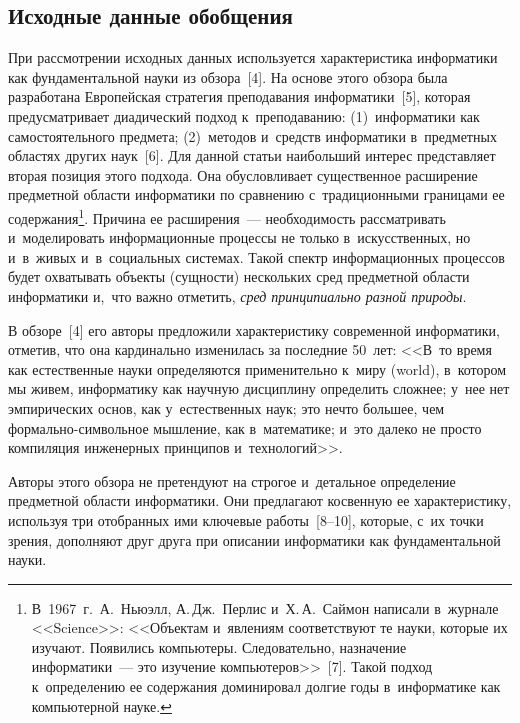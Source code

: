 \begin{multicols}{2}
\section{Исходные данные обобщения}

  При рассмотрении исходных данных используется характеристика 
информатики как фундаментальной науки из обзора~[4]. На основе этого обзора была разработана Европейская 
стратегия преподавания информатики~[5], которая предусматривает 
диадический подход к~преподаванию: (1)~информатики как самостоятельного 
предмета; (2)~методов и~средств информатики в~предметных областях других 
наук~[6]. Для данной статьи наибольший интерес представляет вторая 
позиция этого подхода. Она обусловливает существенное расширение 
предметной области информатики по сравнению с~традиционными 
границами ее содержания\footnote{В~1967~г.\ А.~Ньюэлл, А.\,Дж.~Перлис 
и~Х.\,А.~Саймон написали в~журнале <<Science>>: <<Объектам и~явлениям соответствуют те науки, 
которые их изучают. Появились компьютеры. Следовательно, назначение информатики~--- это 
изучение компьютеров>>~[7]. Такой подход к~определению ее содержания доминировал долгие 
годы в~информатике как компьютерной науке.}. Причина ее расширения~--- 
необходимость рассматривать и~моделировать информационные процессы не 
только в~искусственных, но и~в~живых и~в~социальных сис\-те\-мах. Такой 
спектр информационных процессов будет охватывать объекты (сущ\-ности) 
нескольких сред предметной об\-ласти информатики и,~что важ\-но отметить, 
\textit{сред принципиально разной природы}.
  
  В обзоре~[4] его авторы предложили характеристику современной 
информатики, отметив, что она кардинально изменилась за последние 
50~лет: <<В~то время как естественные науки определяются применительно 
к~миру (world), в~котором мы живем, информатику как научную дисциплину 
определить сложнее; у~нее нет эмпирических основ, как у~естественных 
наук; это нечто большее, чем фор\-маль\-но-сим\-воль\-ное мышление, как 
в~математике; и~это далеко не просто компиляция инженерных принципов 
и~технологий>>.
  
  Авторы этого обзора не претендуют на строгое и~детальное определение 
предметной области информатики. Они предлагают косвенную ее 
характеристику, используя три отобранных ими ключевые работы~[8--10], 
которые, с~их точки зрения, дополняют друг друга при описании 
информатики как фундаментальной науки.
  

\end{multicols}
